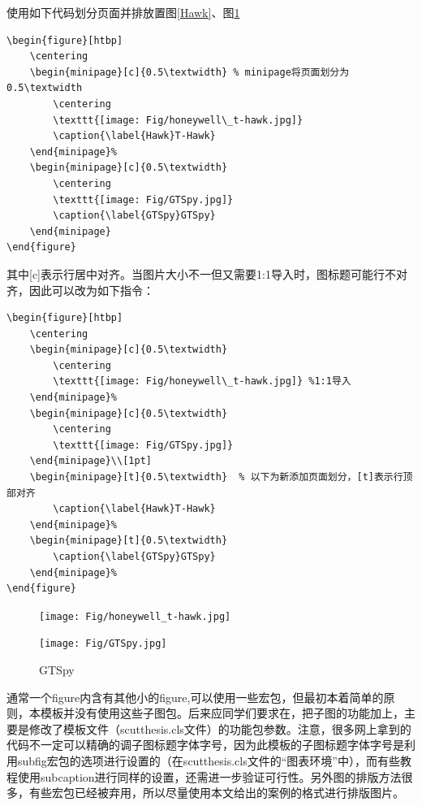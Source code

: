 使用如下代码划分页面并排放置图\ref{Hawk}、图\ref{GTSpy}
\begin{lstlisting}
\begin{figure}[htbp]
	\centering
	\begin{minipage}[c]{0.5\textwidth} % minipage将页面划分为0.5\textwidth
		\centering
		\texttt{[image: Fig/honeywell\_t-hawk.jpg]}
		\caption{\label{Hawk}T-Hawk}
	\end{minipage}%
	\begin{minipage}[c]{0.5\textwidth}
		\centering
		\texttt{[image: Fig/GTSpy.jpg]}
		\caption{\label{GTSpy}GTSpy}
	\end{minipage}
\end{figure}
\end{lstlisting}
其中[c]表示行居中对齐。当图片大小不一但又需要1:1导入时，图标题可能行不对齐，因此可以改为如下指令：
\begin{lstlisting}
\begin{figure}[htbp]
	\centering
	\begin{minipage}[c]{0.5\textwidth}
		\centering
		\texttt{[image: Fig/honeywell\_t-hawk.jpg]} %1:1导入
	\end{minipage}%
	\begin{minipage}[c]{0.5\textwidth}
		\centering
		\texttt{[image: Fig/GTSpy.jpg]}
	\end{minipage}\\[1pt]
	\begin{minipage}[t]{0.5\textwidth}	% 以下为新添加页面划分，[t]表示行顶部对齐
		\caption{\label{Hawk}T-Hawk}
	\end{minipage}%
	\begin{minipage}[t]{0.5\textwidth}
		\caption{\label{GTSpy}GTSpy}
	\end{minipage}%
\end{figure}
\end{lstlisting}
\begin{figure}[htbp]
	\centering
	\begin{minipage}[c]{0.5\textwidth}
		\centering
		\texttt{[image: Fig/honeywell\_t-hawk.jpg]}
		\caption{\label{Hawk}T-Hawk}
	\end{minipage}%
	\begin{minipage}[c]{0.5\textwidth}
		\centering
		\texttt{[image: Fig/GTSpy.jpg]}
		\caption{\label{GTSpy}GTSpy}
	\end{minipage}
\end{figure}


通常一个figure内含有其他小的figure,可以使用一些宏包，但最初本着简单的原则，本模板并没有使用这些子图包。后来应同学们要求在，把子图的功能加上，主要是修改了模板文件（scutthesis.cls文件）的功能包参数。注意，很多网上拿到的代码不一定可以精确的调子图标题字体字号，因为此模板的子图标题字体字号是利用subfig宏包的选项进行设置的（在scutthesis.cls文件的“图表环境”中），而有些教程使用subcaption进行同样的设置，还需进一步验证可行性。另外图的排版方法很多，有些宏包已经被弃用，所以尽量使用本文给出的案例的格式进行排版图片。


